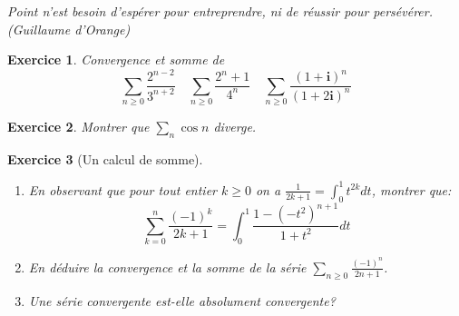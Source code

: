 \documentclass[12pt,a4paper]{article}
\newcommand{\I}{\mathbf{i}}
\theoremstyle{break}
\newtheorem{Exo}{Exercice}
\begin{document}
\textit{Point n'est besoin d'espérer pour entreprendre, ni de réussir pour persévérer. (Guillaume d'Orange)}

\begin{Exo}
Convergence et somme de $$\sum_{n\geqslant 0} \frac{2^{n-2}}{3^{n+2}}\quad \sum_{n\geqslant 0}\frac{2^n+1}{4^n}\quad\sum_{n\geqslant 0}\frac{(1+\I)^n}{(1+2\I)^n}$$
\end{Exo}

\begin{Exo}
Montrer que $\sum_n \cos n$ diverge.
\end{Exo}


%	
%	

\begin{Exo}[Un calcul de somme]\ 
	
	\begin{enumerate}
		\item
		En observant que pour tout entier $k \geqslant 0$ on a $\frac{1}{2k+1}=\int_{0}^{1}t^{2k}dt$, montrer que:
		$$\sum_{k=0}^{n}\frac{(-1)^k}{2k+1}=\int_{0}^{1}\frac{1-(-t^2)^{n+1}}{1+t^2}dt$$
		\item En déduire la convergence et la somme de la série $\sum_{n\geqslant 0}\frac{(-1)^n}{2n+1}$.
		\item Une série convergente est-elle absolument convergente?
	\end{enumerate}
	
\end{Exo}
\end{document}
